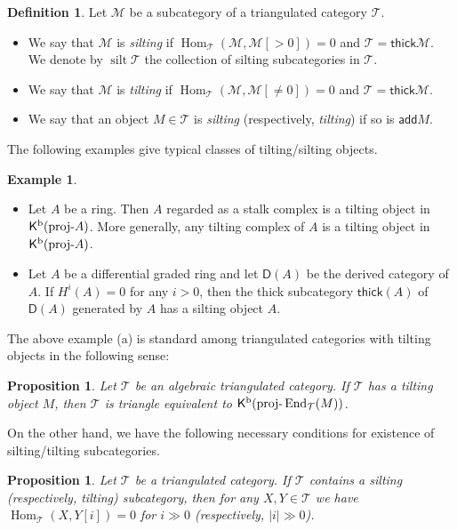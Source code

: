 \documentclass[a4paper,reqno]{amsart}
\newtheorem{proposition}[theorem]{Proposition}
\theoremstyle{definition}
\newtheorem{definition}[theorem]{Definition}
\newtheorem{example}[theorem]{Example}
\newcommand{\TT}{{\mathcal T}}
\newcommand{\MM}{{\mathcal M}}
\newcommand{\add}{\mathsf{add}}
\newcommand{\thick}{\mathsf{thick}}
\newcommand{\Hom}{\operatorname{Hom}\nolimits}
\newcommand{\silt}{\operatorname{silt}\nolimits}
\newcommand{\proj}[1]{{\rm{proj}}\text{-}#1} %
\newcommand{\K}{\mathsf{K}}
\newcommand{\D}{\mathsf{D}}
\newcommand{\End}{\operatorname{End}\nolimits}
\begin{document}
\begin{definition}\label{definition of silting}
Let $\MM$ be a subcategory of a triangulated category $\TT$.
\begin{itemize}
\item[(a)] We say that $\MM$ is \emph{silting} if $\Hom_{\TT}(\MM, \MM[>0])=0$ and $\TT=\thick\MM$. 
We denote by $\silt\TT$ the collection of silting subcategories in $\TT$.
\item[(b)] We say that $\MM$ is \emph{tilting} if $\Hom_{\TT}(\MM, \MM[\neq0])=0$ and $\TT=\thick\MM$.
\item[(c)] We say that an object $M\in\TT$ is \emph{silting} (respectively, \emph{tilting}) if so is $\add M$.
\end{itemize}
\end{definition}

The following examples give typical classes of tilting/silting objects.

\begin{example}
\begin{itemize}
\item[(a)] Let $A$ be a ring.
Then $A$ regarded as a stalk complex is a tilting object in $\K^{\rm b}(\proj A)$.
More generally, any tilting complex of $A$ is a tilting object in $\K^{\rm b}(\proj A)$.
\item[(b)] Let $A$ be a differential graded ring and let $\D(A)$ be the derived category of $A$.
If $H^i(A)=0$ for any $i>0$, then the thick subcategory $\thick(A)$ of $\D(A)$ generated by $A$
has a silting object $A$.
\end{itemize}
\end{example}

The above example (a) is standard among triangulated categories with tilting objects in the following sense:

\begin{proposition}\cite{K}
Let $\TT$ be an algebraic triangulated category.
If $\TT$ has a tilting object $M$, then $\TT$ is triangle equivalent
to $\K^{\rm b}(\proj\End_{\TT}(M))$.
\end{proposition}


On the other hand, we have the following necessary conditions for existence of silting/tilting subcategories.

\begin{proposition}\label{silting vanishing}
Let $\TT$ be a triangulated category.
If $\TT$ contains a silting (respectively, tilting) subcategory,
then for any $X,Y\in\TT$ we have $\Hom_{\TT}(X,Y[i])=0$ for $i\gg0$ (respectively, $|i|\gg0$).
\end{proposition}
\end{document}
